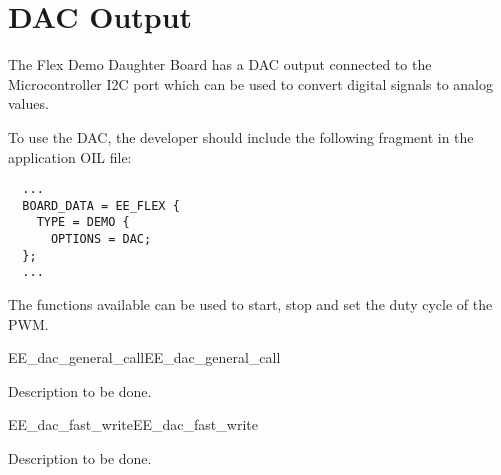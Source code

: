 \section{DAC Output}

The Flex Demo Daughter Board has a DAC output connected to the
Microcontroller I2C port which can be used to convert digital signals
to analog values.

To use the DAC, the developer should
include the following fragment in the application OIL file:

\begin{lstlisting}
  ...
  BOARD_DATA = EE_FLEX {
    TYPE = DEMO {
      OPTIONS = DAC;
  };
  ...
\end{lstlisting}

The functions available can be used to start, stop and set the duty
cycle of the PWM.


\begin{function_nopb2}{EE\_dac\_general\_call}{EE_dac_general_call}
  
  \begin{fundescription}
    Description to be done. 
  \end{fundescription}
  
\begin{funparameters}
\end{funparameters}
  
\begin{funreturn}
\end{funreturn}
  
\end{function_nopb2}

\begin{function_nopb2}{EE\_dac\_fast\_write}{EE_dac_fast_write}
  
  \begin{fundescription}
    Description to be done. 
  \end{fundescription}
  
\begin{funparameters}
\end{funparameters}
  
\begin{funreturn}
\end{funreturn}
  
\end{function_nopb2}


